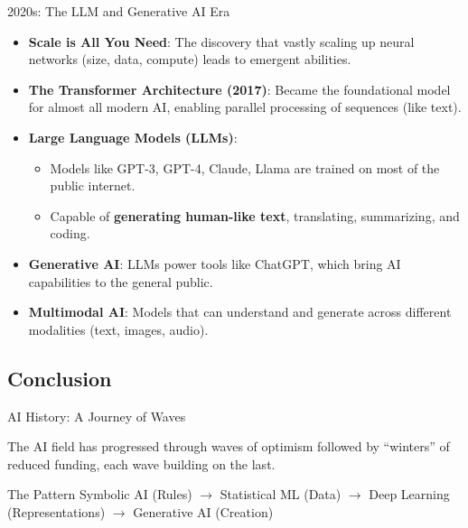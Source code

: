 \documentclass{beamer}
\begin{document}
\begin{frame}[t]{2020s: The LLM and Generative AI Era}
\begin{itemize}
    \item \textbf{Scale is All You Need}: The discovery that vastly scaling up neural networks (size, data, compute) leads to emergent abilities.
    \item \textbf{The Transformer Architecture (2017)}: Became the foundational model for almost all modern AI, enabling parallel processing of sequences (like text).
    \item \textbf{Large Language Models (LLMs)}:
        \begin{itemize}
            \item Models like GPT-3, GPT-4, Claude, Llama are trained on most of the public internet.
            \item Capable of \textbf{generating human-like text}, translating, summarizing, and coding.
        \end{itemize}
    \item \textbf{Generative AI}: LLMs power tools like ChatGPT, which bring AI capabilities to the general public.
    \item \textbf{Multimodal AI}: Models that can understand and generate across different modalities (text, images, audio).
\end{itemize}
\begin{center}
\end{center}
\end{frame}

\subsection{Conclusion}

\begin{frame}[t]{AI History: A Journey of Waves}
\begin{center}
    \scriptsize{The AI field has progressed through waves of optimism followed by ``winters'' of reduced funding, each wave building on the last.}
\end{center}
\begin{block}{The Pattern}
Symbolic AI (Rules) $\rightarrow$ Statistical ML (Data) $\rightarrow$ Deep Learning (Representations) $\rightarrow$ Generative AI (Creation)
\end{block}
\end{frame}
\end{document}
